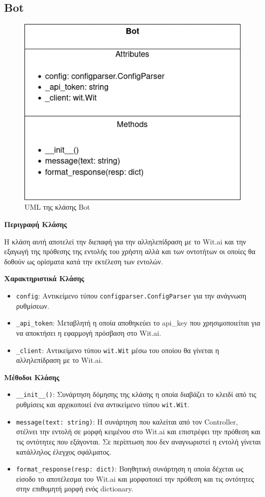 \subsection{Bot}
\begin{figure}[h]
    \centering
    \includegraphics[scale=0.7]{images/chapter4/uml_diagrams/Bot.png}
    \caption{UML της κλάσης Bot}
    \label{fig:bot}
\end{figure}
\noindent\textbf{Περιγραφή Κλάσης}

Η κλάση αυτή αποτελεί την διεπαφή για την αλληλεπίδραση με το Wit.ai και την εξαγωγή της πρόθεσης της εντολής του χρήστη αλλά και των οντοτήτων οι οποίες θα δοθούν ως ορίσματα κατά την εκτέλεση των εντολών.

\noindent\textbf{Χαρακτηριστικά Κλάσης}
\begin{itemize}
    \item \texttt{config}: Αντικείμενο τύπου \texttt{configparser.ConfigParser} για την ανάγνωση ρυθμίσεων.
    \item \texttt{\_api\_token}: Μεταβλητή η οποία αποθηκεύει το api\_key που χρησιμοποιείται για να αποκτήσει η εφαρμογή πρόσβαση στο Wit.ai.
    \item \texttt{\_client}: Αντικείμενο τύπου \texttt{wit.Wit} μέσω του οποίου θα γίνεται η αλληλεπίδραση με το Wit.ai.
\end{itemize}
\noindent\textbf{Μέθοδοι Κλάσης}
\begin{itemize}
    \item \texttt{\_\_init\_\_()}: Συνάρτηση δόμησης της κλάσης η οποία διαβάζει το κλειδί από τις ρυθμίσεις και αρχικοποιεί ένα αντικείμενο τύπου \texttt{wit.Wit}.
    \item \texttt{message(text: string)}: Η συνάρτηση που καλείται από τον Controller, στέλνει την εντολή σε μορφή κειμένου στο Wit.ai και επιστρέφει την πρόθεση και τις οντότητες που εξάγονται. Σε περίπτωση που δεν αναγνωριστεί η εντολή γίνεται κατάλληλος έλεγχος σφάλματος.
    \item \texttt{format\_response(resp: dict)}: Βοηθητική συνάρτηση η οποία δέχεται ως είσοδο το αποτέλεσμα του Wit.ai και μορφοποιεί την πρόθεση και τις οντότητες στην επιθυμητή μορφή ενός dictionary.
\end{itemize}

